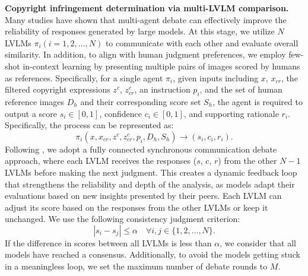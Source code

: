 \textbf{Copyright infringement determination via multi-LVLM comparison.} 
Many studies \cite{du2023improving, chan2023chateval, lakara2024mad, liu2024groupdebate} have shown that multi-agent debate can effectively improve the reliability of responses generated by large models. At this stage, we utilize $N$ LVLMs $\pi_i (i = 1, 2, …, N)$ to communicate with each other and evaluate overall similarity. In addition, to align with human judgment preferences, we employ few-shot in-context learning \cite{dong2022survey, agarwal2024many} by presenting multiple pairs of images scored by humans as references. Specifically, for a single agent $\pi_i$, given inputs including $x$, $x_{cr}$, the filtered copyright expressions $z^c$, $z^c_{cr}$,  an instruction $p_i$, and the set of human reference images $D_h$ and their corresponding score set $S_h$, the agent is required to output a score $s_i \in [0,1]$, confidence $c_i \in [0,1]$, and supporting rationale $r_i$. Specifically, the process can be represented as:
\begin{equation}
\pi_i(x, x_{{cr}}, z^c, z^c_{cr}, p_i, D_h, S_h) \to (s_i, c_i, r_i).
\end{equation}
Following \cite{du2023improving}, we adopt a fully connected synchronous communication debate approach, where each LVLM receives the responses ($s$, $c$, $r$) from the other $N-1$ LVLMs before making the next judgment. This creates a dynamic feedback loop that strengthens the reliability and depth of the analysis, as models adapt their evaluations based on new insights presented by their peers. Each LVLM can adjust its score based on the responses from the other LVLMs or keep it unchanged. We use the following consistency judgment criterion: 
\begin{equation}
\left| s_i - s_j \right| \leq \alpha \quad \forall i, j \in \{1, 2, \dots, N\}.
\end{equation}
If the difference in scores between all LVLMs is less than $\alpha$, we consider that all models have reached a consensus. Additionally, to avoid the models getting stuck in a meaningless loop, we set the maximum number of debate rounds to $M$.

